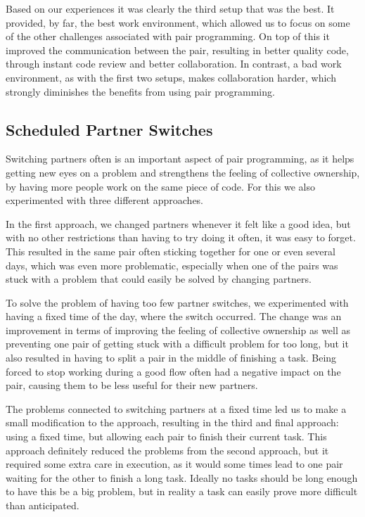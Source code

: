 


Based on our experiences it was clearly the third setup that was the best.
It provided, by far, the best work environment, which allowed us to focus on some of the other challenges associated with pair programming.
On top of this it improved the communication between the pair, resulting in better quality code, through instant code review and better collaboration.
In contrast, a bad work environment, as with the first two setups, makes collaboration harder, which strongly diminishes the benefits from using pair programming.


\subsection{Scheduled Partner Switches}
Switching partners often is an important aspect of pair programming, as it helps getting new eyes on a problem and strengthens the feeling of collective ownership, by having more people work on the same piece of code.
For this we also experimented with three different approaches.

In the first approach, we changed partners whenever it felt like a good idea, but with no other restrictions than having to try doing it often, it was easy to forget.
This resulted in the same pair often sticking together for one or even several days, which was even more problematic, especially when one of the pairs was stuck with a problem that could easily be solved by changing partners.

To solve the problem of having too few partner switches, we experimented with having a fixed time of the day, where the switch occurred.
The change was an improvement in terms of improving the feeling of collective ownership as well as preventing one pair of getting stuck with a difficult problem for too long, but it also resulted in having to split a pair in the middle of finishing a task.
Being forced to stop working during a good flow often had a negative impact on the pair, causing them to be less useful for their new partners.

The problems connected to switching partners at a fixed time led us to make a small modification to the approach, resulting in the third and final approach: using a fixed time, but allowing each pair to finish their current task.
This approach definitely reduced the problems from the second approach, but it required some extra care in execution, as it would some times lead to one pair waiting for the other to finish a long task. Ideally no tasks should be long enough to have this be a big problem, but in reality a task can easily prove more difficult than anticipated.

